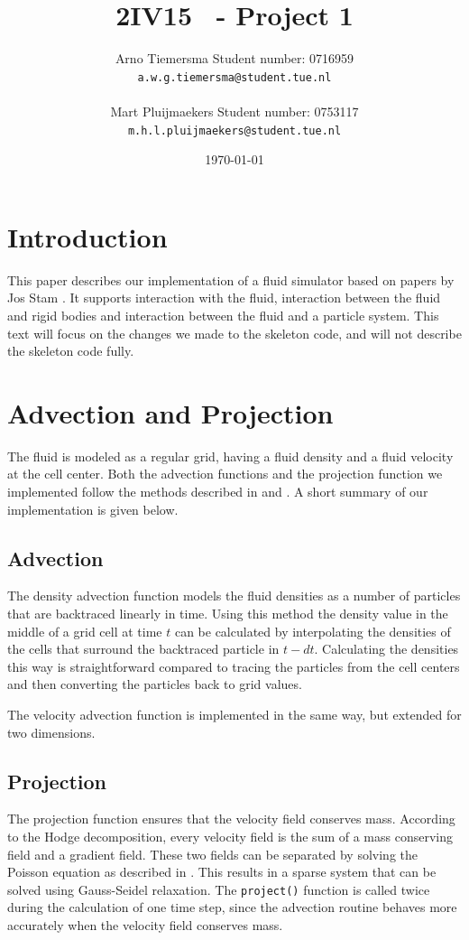 \documentclass[a4paper,twoside,11pt,twocolumn]{article}
\title{\sffamily\bfseries 2IV15 \scg\ - Project 1}
\author{Arno Tiemersma \qquad Student number: 0716959 \\{\tt a.w.g.tiemersma@student.tue.nl}\\ \\Mart Pluijmaekers \qquad Student number: 0753117 \\{\tt m.h.l.pluijmaekers@student.tue.nl}}
\date{\today}
\begin{document}
\maketitle
\section{Introduction}
This paper describes our implementation of a fluid simulator based on papers by Jos Stam \cite{url:stam1, url:stam2}. It supports interaction with the fluid, interaction between the fluid and rigid bodies and interaction between the fluid and a particle system. This text will focus on the changes we made to the skeleton code, and will not describe the skeleton code fully.

\section{Advection and Projection}
The fluid is modeled as a regular grid, having a fluid density and a fluid velocity at the cell center. Both the advection functions and the projection function we implemented follow the methods described in \cite{url:stam1} and \cite{url:stam2}. A short summary of our implementation is given below.

\subsection{Advection}
The density advection function models the fluid densities as a number of particles that are backtraced linearly in time. Using this method the density value in the middle of a grid cell at time $t$ can be calculated by interpolating the densities of the cells that surround the backtraced particle in $t-dt$. Calculating the densities this way is straightforward compared to tracing the particles from the cell centers and then converting the particles back to grid values. 

The velocity advection function is implemented in the same way, but extended for two dimensions.

\subsection{Projection}
The projection function ensures that the velocity field conserves mass. According to the Hodge decomposition, every velocity field is the sum of a mass conserving field and a gradient field. These two fields can be separated by solving the Poisson equation as described in \cite{url:stam2}. This results in a sparse system that can be solved using Gauss-Seidel relaxation. The \texttt{project()} function is called twice during the calculation of one time step, since the advection routine behaves more accurately when the velocity field conserves mass. 
\end{document}
